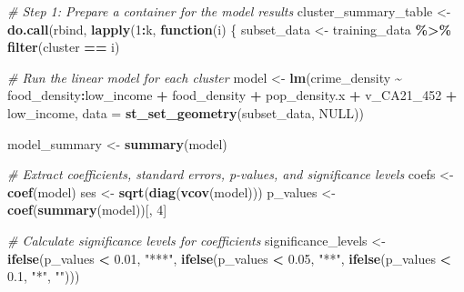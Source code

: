 \documentclass[
]{article}
\newenvironment{Shaded}{\begin{snugshade}}{\end{snugshade}}
\newcommand{\AttributeTok}[1]{\textcolor[rgb]{0.13,0.29,0.53}{#1}}
\newcommand{\CommentTok}[1]{\textcolor[rgb]{0.56,0.35,0.01}{\textit{#1}}}
\newcommand{\ConstantTok}[1]{\textcolor[rgb]{0.56,0.35,0.01}{#1}}
\newcommand{\ControlFlowTok}[1]{\textcolor[rgb]{0.13,0.29,0.53}{\textbf{#1}}}
\newcommand{\DecValTok}[1]{\textcolor[rgb]{0.00,0.00,0.81}{#1}}
\newcommand{\FloatTok}[1]{\textcolor[rgb]{0.00,0.00,0.81}{#1}}
\newcommand{\FunctionTok}[1]{\textcolor[rgb]{0.13,0.29,0.53}{\textbf{#1}}}
\newcommand{\NormalTok}[1]{#1}
\newcommand{\OtherTok}[1]{\textcolor[rgb]{0.56,0.35,0.01}{#1}}
\newcommand{\SpecialCharTok}[1]{\textcolor[rgb]{0.81,0.36,0.00}{\textbf{#1}}}
\newcommand{\StringTok}[1]{\textcolor[rgb]{0.31,0.60,0.02}{#1}}
\begin{document}
\begin{Shaded}
\begin{Highlighting}[]
\CommentTok{\# Step 1: Prepare a container for the model results}
\NormalTok{cluster\_summary\_table }\OtherTok{\textless{}{-}} \FunctionTok{do.call}\NormalTok{(rbind, }\FunctionTok{lapply}\NormalTok{(}\DecValTok{1}\SpecialCharTok{:}\NormalTok{k, }\ControlFlowTok{function}\NormalTok{(i) \{}
\NormalTok{  subset\_data }\OtherTok{\textless{}{-}}\NormalTok{ training\_data }\SpecialCharTok{\%\textgreater{}\%} \FunctionTok{filter}\NormalTok{(cluster }\SpecialCharTok{==}\NormalTok{ i)}
  
  \CommentTok{\# Run the linear model for each cluster}
\NormalTok{  model }\OtherTok{\textless{}{-}} \FunctionTok{lm}\NormalTok{(crime\_density }\SpecialCharTok{\textasciitilde{}} 
\NormalTok{                food\_density}\SpecialCharTok{:}\NormalTok{low\_income }\SpecialCharTok{+} 
\NormalTok{                food\_density }\SpecialCharTok{+} 
\NormalTok{                pop\_density.x }\SpecialCharTok{+} 
\NormalTok{                v\_CA21\_452 }\SpecialCharTok{+}
\NormalTok{                low\_income, }
              \AttributeTok{data =} \FunctionTok{st\_set\_geometry}\NormalTok{(subset\_data, }\ConstantTok{NULL}\NormalTok{))}
  
\NormalTok{  model\_summary }\OtherTok{\textless{}{-}} \FunctionTok{summary}\NormalTok{(model)}
  
  \CommentTok{\# Extract coefficients, standard errors, p{-}values, and significance levels}
\NormalTok{  coefs }\OtherTok{\textless{}{-}} \FunctionTok{coef}\NormalTok{(model)}
\NormalTok{  ses }\OtherTok{\textless{}{-}} \FunctionTok{sqrt}\NormalTok{(}\FunctionTok{diag}\NormalTok{(}\FunctionTok{vcov}\NormalTok{(model)))}
\NormalTok{  p\_values }\OtherTok{\textless{}{-}} \FunctionTok{coef}\NormalTok{(}\FunctionTok{summary}\NormalTok{(model))[, }\DecValTok{4}\NormalTok{]}
  
  \CommentTok{\# Calculate significance levels for coefficients}
\NormalTok{  significance\_levels }\OtherTok{\textless{}{-}} \FunctionTok{ifelse}\NormalTok{(p\_values }\SpecialCharTok{\textless{}} \FloatTok{0.01}\NormalTok{, }\StringTok{"***"}\NormalTok{,}
                          \FunctionTok{ifelse}\NormalTok{(p\_values }\SpecialCharTok{\textless{}} \FloatTok{0.05}\NormalTok{, }\StringTok{"**"}\NormalTok{,}
                          \FunctionTok{ifelse}\NormalTok{(p\_values }\SpecialCharTok{\textless{}} \FloatTok{0.1}\NormalTok{, }\StringTok{"*"}\NormalTok{, }\StringTok{""}\NormalTok{)))}
  

\end{Highlighting}
\end{Shaded}
\end{document}
